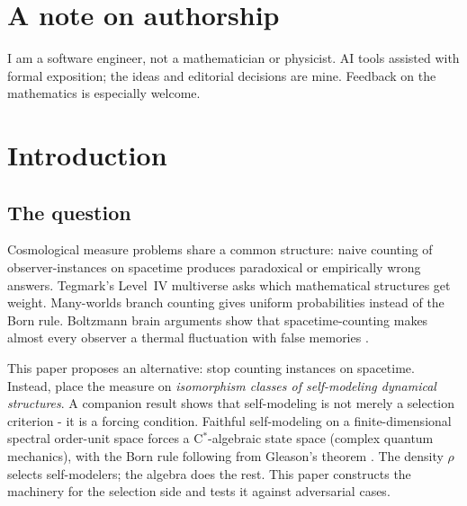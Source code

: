 \documentclass[12pt]{article}
\theoremstyle{remark}
\begin{document}

\section*{A note on authorship}

I am a software engineer, not a mathematician or physicist. AI tools assisted with formal exposition; the ideas and editorial decisions are mine. Feedback on the mathematics is especially welcome.


\section{Introduction}

\subsection{The question}

Cosmological measure problems share a common structure: naive counting of observer-instances on spacetime produces paradoxical or empirically wrong answers. Tegmark's Level~IV multiverse \cite{tegmark1998,tegmark2008} asks which mathematical structures get weight. Many-worlds branch counting gives uniform probabilities instead of the Born rule. Boltzmann brain arguments show that spacetime-counting makes almost every observer a thermal fluctuation with false memories \cite{carroll2017}.

This paper proposes an alternative: stop counting instances on spacetime. Instead, place the measure on \emph{isomorphism classes of self-modeling dynamical structures}. A companion result \cite{ehrlich2026qm} shows that self-modeling is not merely a selection criterion - it is a forcing condition. Faithful self-modeling on a finite-dimensional spectral order-unit space forces a C$^*$-algebraic state space (complex quantum mechanics), with the Born rule following from Gleason's theorem \cite{gleason1957}. The density $\rho$ selects self-modelers; the algebra does the rest. This paper constructs the machinery for the selection side and tests it against adversarial cases.
\end{document}
